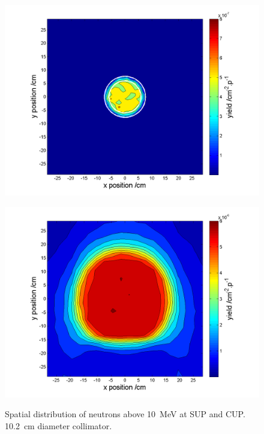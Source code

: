 \documentclass[11pt,a4paper]{IEEEtran}
\let\MYoriglatexcaption\caption
\renewcommand{\caption}[2][\relax]{\MYoriglatexcaption[#2]{#2}}
\begin{document}
\begin{figure}[t]
    \begin{minipage}{\columnwidth}
        \includegraphics[width=\columnwidth]{SUP10ColSpatialDistribution10MeVRADECS.png}
        \label{fig:SUPDensity}
    \end{minipage}
    \begin{minipage}{\columnwidth}
        \includegraphics[width=\columnwidth]{CUP10ColSpatialDistribution10MeV.png}
        \label{fig:CUPDensity}
    \end{minipage}
    \caption{
        Spatial distribution of neutrons above \SI{10}{\MeV} at SUP and CUP.
        \SI{10.2}{\cm} diameter collimator.
    }
\end{figure}
\end{document}
